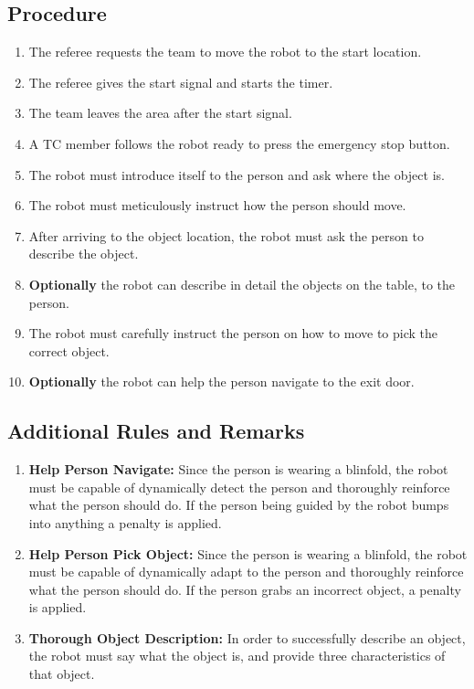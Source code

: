 \subsection*{Procedure}
	\begin{enumerate}[nosep]
		\item The referee requests the team to move the robot to the start location.
		\item The referee gives the start signal and starts the timer.
		\item The team leaves the area after the start signal.
		\item A TC member follows the robot ready to press the emergency stop button.
		\item The robot must introduce itself to the person and ask where the object is.
		\item The robot must meticulously instruct how the person should move. 
		\item After arriving to the object location, the robot must ask the person to describe the object.
		\item \textbf{Optionally} the robot can describe in detail the objects on the table, to the person.
		\item The robot must carefully instruct the person on how to move to pick the correct object. 
		\item \textbf{Optionally} the robot can help the person navigate to the exit door.
	\end{enumerate}

\subsection*{Additional Rules and Remarks}
\begin{enumerate}[nosep]

	\item \textbf{Help Person Navigate:} Since the person is wearing a blinfold, the robot must be capable of dynamically detect the person and thoroughly reinforce what the person should do. If the person being guided by the robot bumps into anything a penalty is applied.
	\item \textbf{Help Person Pick Object:} Since the person is wearing a blinfold, the robot must be capable of dynamically adapt to the person and thoroughly reinforce what the person should do. If the person grabs an incorrect object, a penalty is applied.
	\item \textbf{Thorough Object Description:} In order to successfully describe an object, the robot must say what the object is, and provide three characteristics of that object.

\end{enumerate}

